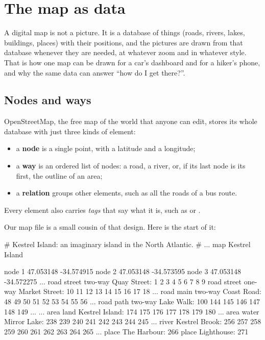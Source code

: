 \chapter{The map as data}\label{ch:mapfile}

A digital map is not a picture. It is a database of things (roads,
rivers, lakes, buildings, places) with their positions, and the pictures
are drawn from that database whenever they are needed, at whatever zoom
and in whatever style. That is how one map can be drawn for a car's
dashboard and for a hiker's phone, and why the same data can answer
``how do I get there?''.

\section{Nodes and ways}

OpenStreetMap, the free map of the world that anyone can edit, stores its
whole database with just three kinds of element:
\begin{itemize}[nosep]
  \item a \textbf{node} is a single point, with a latitude and a longitude;
  \item a \textbf{way} is an ordered list of nodes: a road, a river, or,
    if its last node is its first, the outline of an area;
  \item a \textbf{relation} groups other elements, such as all the roads
    of a bus route.
\end{itemize}
Every element also carries \emph{tags} that say what it is, such as
 or .

Our map file is a small cousin of that design. Here is the start of it:

\begin{shell}
# Kestrel Island: an imaginary island in the North Atlantic.
# ...
map Kestrel Island

node 1 47.053148 -34.574915
node 2 47.053148 -34.573595
node 3 47.053148 -34.572275
...
road street two-way Quay Street: 1 2 3 4 5 6 7 8 9
road street one-way Market Street: 10 11 12 13 14 15 16 17 18
...
road main two-way Coast Road: 48 49 50 51 52 53 54 55 56 ...
road path two-way Lake Walk: 100 144 145 146 147 148 149 ...
...
area land Kestrel Island: 174 175 176 177 178 179 180 ...
area water Mirror Lake: 238 239 240 241 242 243 244 245 ...
river Kestrel Brook: 256 257 258 259 260 261 262 263 264 265
...
place The Harbour: 266
place Lighthouse: 271
\end{shell}

